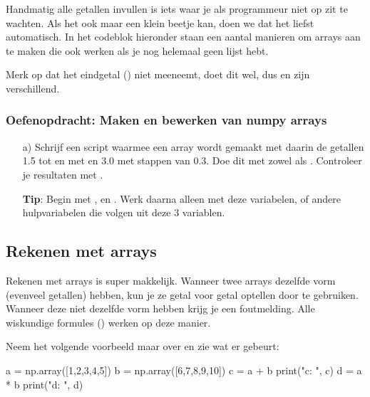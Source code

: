 \documentclass[a4paper,11pt, fleqn]{article}
\begin{document}
Handmatig alle getallen invullen is iets waar je als programmeur niet op zit te wachten. Als het ook maar een klein beetje kan, doen we dat het liefst automatisch. In het codeblok hieronder staan een aantal manieren om arrays aan te maken die ook werken als je nog helemaal geen lijst hebt.


Merk op dat  het eindgetal () niet meeneemt,  doet dit wel, dus  en  zijn verschillend. 

\subsubsection*{Oefenopdracht: Maken en bewerken van numpy arrays}
\begin{itemize}
	\item[a)] Schrijf een script waarmee een array wordt gemaakt met daarin de getallen 1.5 tot en met en 3.0 met stappen van 0.3. Doe dit met zowel  als . Controleer je resultaten met .
	
	{\bf Tip}: Begin met ,  en . Werk daarna alleen met deze variabelen, of andere hulpvariabelen die volgen uit deze 3 variablen.
	
\end{itemize}

\subsection{Rekenen met arrays}
Rekenen met arrays is super makkelijk. Wanneer twee arrays dezelfde vorm (evenveel getallen) hebben, kun je ze getal voor getal optellen door \pythoninline{+} te gebruiken. Wanneer deze niet dezelfde vorm hebben krijg je een foutmelding. Alle wiskundige formules (\pythoninline{+,-,/,*,**}) werken op deze manier.

Neem het volgende voorbeeld maar over en zie wat er gebeurt:
\begin{python}
a = np.array([1,2,3,4,5])
b = np.array([6,7,8,9,10])
c = a + b
print("c: ", c)
d = a * b
print("d: ", d)
\end{python}
\end{document}
